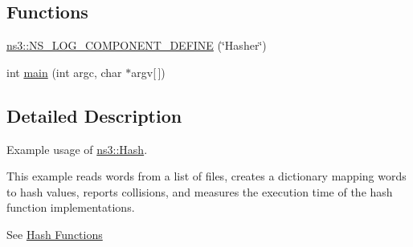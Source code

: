 \subsection*{Functions}
\begin{DoxyCompactItemize}
\item 
\hyperlink{namespacens3_a836449775bd07dc59d2e85e7d47fd2e2}{ns3\+::\+N\+S\+\_\+\+L\+O\+G\+\_\+\+C\+O\+M\+P\+O\+N\+E\+N\+T\+\_\+\+D\+E\+F\+I\+NE} (\char`\"{}Hasher\char`\"{})
\item 
int \hyperlink{hash-example_8cc_a0ddf1224851353fc92bfbff6f499fa97}{main} (int argc, char $\ast$argv\mbox{[}$\,$\mbox{]})
\end{DoxyCompactItemize}


\subsection{Detailed Description}
Example usage of \hyperlink{namespacens3_1_1Hash}{ns3\+::\+Hash}.

This example reads words from a list of files, creates a dictionary mapping words to hash values, reports collisions, and measures the execution time of the hash function implementations.

See \hyperlink{group__hash}{Hash Functions}

